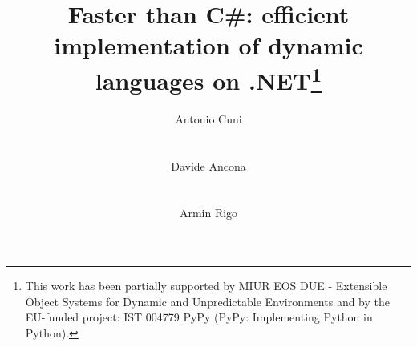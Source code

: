 \documentclass{acm_proc_article-sp}
\begin{document}

\title{Faster than C\#: efficient implementation of dynamic languages on
  .NET\thanks{This work has been partially supported by MIUR EOS DUE -
    Extensible Object Systems for Dynamic and Unpredictable Environments and
    by the EU-funded project: IST 004779 PyPy (PyPy: Implementing Python in
    Python).}}



\author{
\alignauthor Antonio Cuni\\
       \\
       \\
\alignauthor Davide Ancona\\
       \\
       \\
\alignauthor Armin Rigo\\
}
\maketitle
\end{document}
